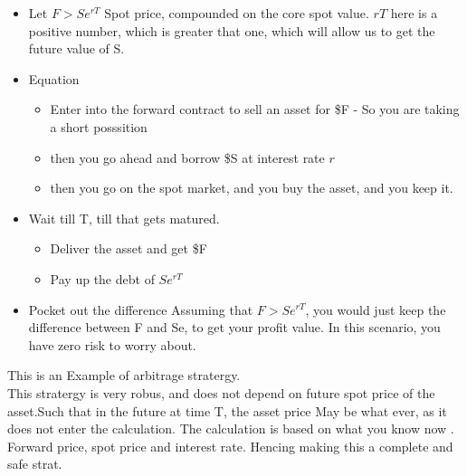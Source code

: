 \documentclass{article}
\theoremstyle{mytheoremstyle}
\theoremstyle{mytheoremstyle}
\theoremstyle{myproblemstyle}
\begin{document}
\begin{itemize}
	\item Let $ F > Se^{rT} $ Spot price, compounded on the core spot value. $rT$ here is a positive number, which is greater that one, which will allow us to get the future value of S.
	\item Equation
	      \begin{itemize}
		      \item Enter into the forward contract to sell an asset for \$F - So you are taking a short posssition
		      \item then you go ahead and borrow \$S at interest rate $r$
		      \item then you go on the spot market, and you buy the asset, and you keep it.

	      \end{itemize}
	\item Wait till T, till that gets matured.
	      \begin{itemize}
		      \item Deliver the asset and get \$F
		      \item Pay up the debt of $Se^{rT}$
	      \end{itemize}

	\item Pocket out the difference
	      Assuming that $F > Se^{rT}$, you would just keep the difference between F and Se, to get your profit value.
	      In this scenario, you have zero risk to worry about.
\end{itemize}
This is an Example of arbitrage stratergy.
\\
This stratergy is very robus, and does not depend on future spot price of the asset.Such that in the future at time T, the asset price May be what ever, as it does not enter the calculation. The calculation is based on what you know now .
Forward price, spot price and interest rate. Hencing making this a complete and safe strat.
\end{document}
